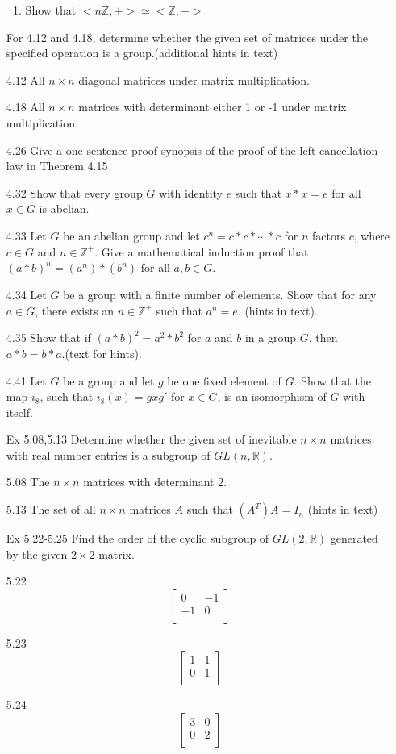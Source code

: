 \documentclass[12pt]{article}
\newcommand{\Z}{\mathds{Z}}
\newcommand{\R}{\mathbb{R}}
\begin{document}
\begin{enumerate}
\begin{enumerate}
				\item Show that $ <n\Z,+> \simeq <\Z,+>$
			\end{enumerate}
			For 4.12 and 4.18, determine whether the given set of matrices under the specified operation is a group.(additional hints in text)
			\item[4.12] All $n \times n$ diagonal matrices under matrix multiplication.
			\item[4.18] All $n \times n$ matrices with determinant either 1 or -1 under matrix multiplication.
			\item[4.26] Give a one sentence proof synopsis of the proof of the left cancellation law in Theorem 4.15
			\item[4.32] Show that every group $G$ with identity $e$ such that $x * x = e$ for all $x \in G$ is abelian.
			\item[4.33] Let $G$ be an abelian group and let $c^n = c* c * \dotsb * c $ for $n$ factors $c$, where $c\in G$ and $n \in \Z^+$. Give a mathematical induction proof that $(a * b)^n = (a^n) * (b^n)$ for all $a,b \in G$.
			\item[4.34] Let $G$ be a group with a finite number of elements. Show that for any $a \in G$, there exists an $n\in \Z^+$ such that $a^n = e$. (hints in text).
			\item[4.35] Show that if $(a  * b)^2 = a^2  * b^2$ for $a$ and $b$ in a group $G$, then $a * b = b  * a$.(text for hints). 
			\item[4.41] Let $G$ be a group and let $g$ be one fixed element of $G$. Show that the map $i_8$, such that $i_8(x) = gxg'$ for $x\in G$, is an isomorphism of $G$ with itself.
		
		\item[Ex 5.08,5.13] Determine whether the given set of inevitable $n \times  n$ matrices with real number entries is a subgroup of $GL(n,\R)$.
			\item[5.08] The $ n \times n $ matrices with determinant 2.
			\item[5.13] The set of all $n \times n$ matrices $A$ such that $(A^T)A=I_n$ (hints in text)
		\item[Ex 5.22-5.25] Find the order of the cyclic subgroup of $GL(2,\R)$ generated by the given $2 \times 2$ matrix. 
		
		\item[5.22]\[
		\begin{bmatrix}
		0   & -1 \\
		-1   & 0 \\
		\end{bmatrix}\]
	\item[5.23]\[
		\begin{bmatrix}
		1   & 1 \\
		0   & 1 \\
		\end{bmatrix}
		\]
	\item[5.24] \[
		\begin{bmatrix}
		3   & 0 \\
		0   & 2 \\
		\end{bmatrix}
		\]
		

\end{enumerate}
\end{document}
